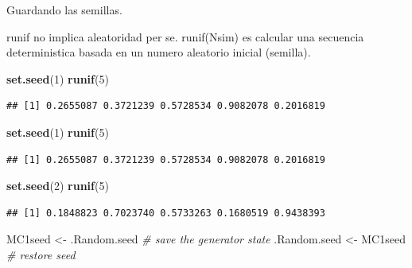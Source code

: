 \documentclass[ignorenonframetext,]{beamer}
\newenvironment{Shaded}{\begin{snugshade}}{\end{snugshade}}
\newcommand{\KeywordTok}[1]{\textcolor[rgb]{0.13,0.29,0.53}{\textbf{#1}}}
\newcommand{\DecValTok}[1]{\textcolor[rgb]{0.00,0.00,0.81}{#1}}
\newcommand{\StringTok}[1]{\textcolor[rgb]{0.31,0.60,0.02}{#1}}
\newcommand{\CommentTok}[1]{\textcolor[rgb]{0.56,0.35,0.01}{\textit{#1}}}
\newcommand{\NormalTok}[1]{#1}
\begin{document}
\begin{frame}[fragile]

\begin{block}{Guardando las semillas.}

runif no implica aleatoridad per se. runif(Nsim) es calcular una
secuencia deterministica basada en un numero aleatorio inicial
(semilla).

\begin{Shaded}
\begin{Highlighting}[]
\KeywordTok{set.seed}\NormalTok{(}\DecValTok{1}\NormalTok{)}
\KeywordTok{runif}\NormalTok{(}\DecValTok{5}\NormalTok{)}
\end{Highlighting}
\end{Shaded}

\begin{verbatim}
## [1] 0.2655087 0.3721239 0.5728534 0.9082078 0.2016819
\end{verbatim}

\begin{Shaded}
\begin{Highlighting}[]
\KeywordTok{set.seed}\NormalTok{(}\DecValTok{1}\NormalTok{)}
\KeywordTok{runif}\NormalTok{(}\DecValTok{5}\NormalTok{)}
\end{Highlighting}
\end{Shaded}

\begin{verbatim}
## [1] 0.2655087 0.3721239 0.5728534 0.9082078 0.2016819
\end{verbatim}

\begin{Shaded}
\begin{Highlighting}[]
\KeywordTok{set.seed}\NormalTok{(}\DecValTok{2}\NormalTok{)}
\KeywordTok{runif}\NormalTok{(}\DecValTok{5}\NormalTok{)}
\end{Highlighting}
\end{Shaded}

\begin{verbatim}
## [1] 0.1848823 0.7023740 0.5733263 0.1680519 0.9438393
\end{verbatim}

\begin{Shaded}
\begin{Highlighting}[]
\NormalTok{MC1seed <-}\StringTok{ }\NormalTok{.Random.seed }\CommentTok{# save the generator state}
\NormalTok{.Random.seed <-}\StringTok{ }\NormalTok{MC1seed }\CommentTok{# restore seed}
\end{Highlighting}
\end{Shaded}

\end{block}

\end{frame}
\end{document}
